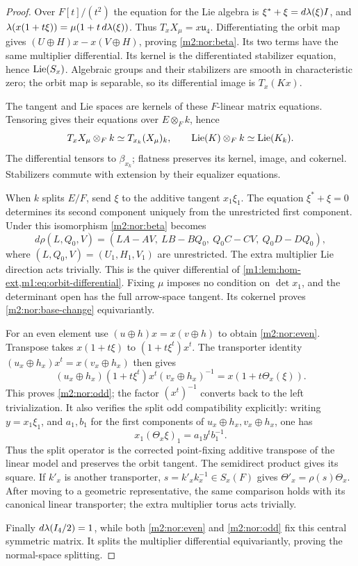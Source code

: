 \begin{proof}
Over $F[t]/(t^2)$ the equation for the Lie algebra is
$\xi^*+\xi=d\lambda(\xi)I$, and
$\lambda(x(1+t\xi))=\mu(1+t\,d\lambda(\xi))$.
Thus $T_xX_\mu=x\mathfrak u_4$. Differentiating the orbit
map gives $(U\oplus H)x-x(V\oplus H)$, proving
\eqref{m2:nor:beta}. Its two terms have the same multiplier differential.
Its kernel is the differentiated stabilizer equation, hence $\operatorname{Lie}(S_x)$.
Algebraic groups and their stabilizers are smooth in characteristic zero;
the orbit map is separable, so its differential image is $T_x(Kx)$.

The tangent and Lie spaces are kernels of these $F$-linear matrix
equations. Tensoring gives their equations over $E\otimes_F k$, hence
\[
 T_xX_\mu\otimes_F k\simeq T_{x_k}(X_\mu)_k,\qquad
 \operatorname{Lie}(K)\otimes_F k\simeq\operatorname{Lie}(K_k).
\]
The differential tensors to $\beta_{x_k}$; flatness preserves its
kernel, image, and cokernel. Stabilizers commute with extension by
their equalizer equations.

When $k$ splits $E/F$, send $\xi$ to the additive tangent $x_1\xi_1$.
The equation $\xi^*+\xi=0$ determines its second component uniquely
from the unrestricted first component. Under this isomorphism
\eqref{m2:nor:beta} becomes
\begin{equation}\label{m2:nor:split-orbit-map}
 d\rho(L,Q_0,V)=
 (LA-AV,\ LB-BQ_0,\ Q_0C-CV,\ Q_0D-DQ_0),
\end{equation}
where $(L,Q_0,V)=(U_1,H_1,V_1)$ are unrestricted. The extra multiplier
Lie direction acts trivially. This is the quiver differential of
\cref{m1:lem:hom-ext,m1:eq:orbit-differential}. Fixing $\mu$ imposes
no condition on $\det x_1$, and the determinant open has the full
arrow-space tangent. Its cokernel proves \eqref{m2:nor:base-change}
equivariantly.

For an even element use $(u\oplus h)x=x(v\oplus h)$ to obtain
\eqref{m2:nor:even}. Transpose takes $x(1+t\xi)$ to
$(1+t\xi^t)x^t$. The transporter identity
$(u_x\oplus h_x)x^t=x(v_x\oplus h_x)$ then gives
\[
 (u_x\oplus h_x)(1+t\xi^t)x^t(v_x\oplus h_x)^{-1}
 =x(1+t\Theta_x(\xi)).
\]
This proves \eqref{m2:nor:odd}; the factor $(x^t)^{-1}$ converts
back to the left trivialization. It also verifies the split odd
compatibility explicitly: writing $y=x_1\xi_1$, and $a_1,b_1$
for the first components of $u_x\oplus h_x,v_x\oplus h_x$, one has
\begin{equation}\label{m2:nor:split-odd}
 x_1(\Theta_x\xi)_1=a_1y^tb_1^{-1}.
\end{equation}
Thus the split operator is the corrected point-fixing additive
transpose of the linear model and preserves the orbit tangent.
The semidirect product gives its square. If $k'_x$ is another
transporter, $s=k'_xk_x^{-1}\in S_x(F)$ gives
$\Theta'_x=\rho(s)\Theta_x$. After moving to a geometric representative,
the same comparison holds with its canonical linear transporter;
the extra multiplier torus acts trivially.

Finally $d\lambda(I_4/2)=1$, while both \eqref{m2:nor:even} and
\eqref{m2:nor:odd} fix this central symmetric matrix. It splits the
multiplier differential equivariantly, proving the normal-space
splitting.
\end{proof}

